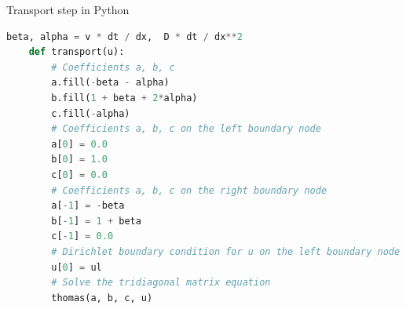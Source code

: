%
%
\begin{frame}[fragile]{Transport step in Python}

\begin{lstlisting}[language=Python, caption=Transport step in Pythons]
	beta, alpha = v * dt / dx,  D * dt / dx**2
	def transport(u):
		# Coefficients a, b, c
		a.fill(-beta - alpha)
		b.fill(1 + beta + 2*alpha)
		c.fill(-alpha)
		# Coefficients a, b, c on the left boundary node
		a[0] = 0.0
		b[0] = 1.0
		c[0] = 0.0
		# Coefficients a, b, c on the right boundary node
		a[-1] = -beta
		b[-1] = 1 + beta
		c[-1] = 0.0
		# Dirichlet boundary condition for u on the left boundary node
		u[0] = ul
		# Solve the tridiagonal matrix equation
		thomas(a, b, c, u)
\end{lstlisting}

\end{frame}
%
%
